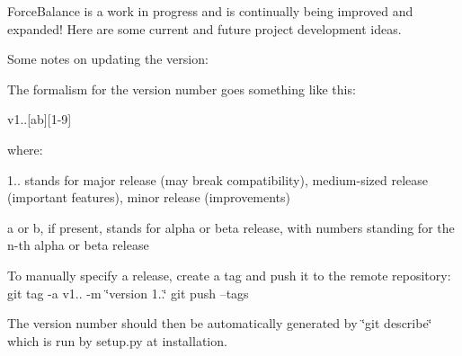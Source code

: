 Force\-Balance is a work in progress and is continually being improved and expanded! Here are some current and future project development ideas.

Some notes on updating the version\-:

The formalism for the version number goes something like this\-:

v1..\mbox{[}ab\mbox{]}\mbox{[}1-\/9\mbox{]}

where\-: \begin{DoxyItemize}
\item 1.. stands for major release (may break compatibility), medium-\/sized release (important features), minor release (improvements) \item a or b, if present, stands for alpha or beta release, with numbers standing for the n-\/th alpha or beta release\end{DoxyItemize}
To manually specify a release, create a tag and push it to the remote repository\-: git tag -\/a v1.. -\/m \char`\"{}version 1..\char`\"{} git push --tags

The version number should then be automatically generated by \char`\"{}git describe\char`\"{} which is run by setup.\-py at installation.

